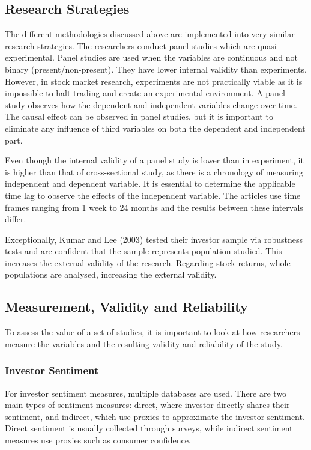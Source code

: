 \subsection{Research Strategies}
The different methodologies discussed above are implemented into very similar research strategies. The researchers conduct panel studies which are quasi-experimental. Panel studies are used when the variables are continuous and not binary (present/non-present). They have lower internal validity than experiments. However, in stock market research, experiments are not practically viable as it is impossible to halt trading and create an experimental environment. A panel study observes how the dependent and independent variables change over time. The causal effect can be observed in panel studies, but it is important to eliminate any influence of third variables on both the dependent and independent part. 
\par
Even though the internal validity of a panel study is lower than in experiment, it is higher than that of cross-sectional study, as there is a chronology of measuring independent and dependent variable. It is essential to determine the applicable time lag to observe the effects of the independent variable. The articles use time frames ranging from 1 week to 24 months and the results between these intervals differ.
\par
Exceptionally, Kumar and Lee (2003) tested their investor sample via robustness tests and are confident that the sample represents population studied. This increases the external validity of the research. Regarding stock returns, whole populations are analysed, increasing the external validity.

\subsection{Measurement, Validity and Reliability}
To assess the value of a set of studies, it is important to look at how researchers measure the variables and the resulting validity and reliability of the study.

\subsubsection{Investor Sentiment}
For investor sentiment measures, multiple databases are used. There are two main types of sentiment measures: direct, where investor directly shares their sentiment, and indirect, which use proxies to approximate the investor sentiment. Direct sentiment is usually collected through surveys, while indirect sentiment measures use proxies such as consumer confidence.

